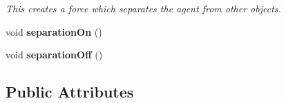 \begin{DoxyCompactItemize}
\begin{DoxyCompactList}\small\item\em \-This creates a force which separates the agent from other objects. \end{DoxyCompactList}\item 
\hypertarget{classAIMovementController_a4bde024b2d464b71181e387ae72dc57d}{
void {\bfseries separation\-On} ()}
\label{d2/d30/classAIMovementController_a4bde024b2d464b71181e387ae72dc57d}

\item 
\hypertarget{classAIMovementController_ae27a67af8ffe159e35024791b1fbebe4}{
void {\bfseries separation\-Off} ()}
\label{d2/d30/classAIMovementController_ae27a67af8ffe159e35024791b1fbebe4}

\end{DoxyCompactItemize}
\subsection*{\-Public \-Attributes}
